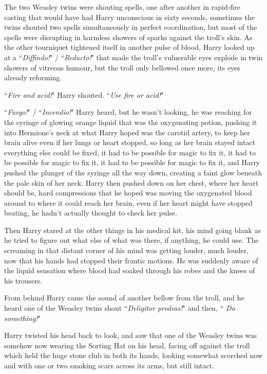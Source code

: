 The two Weasley twins were shouting spells, one after another in rapid-fire casting that would have had Harry unconscious in sixty seconds, sometimes the twins shouted two spells simultaneously in perfect coordination, but most of the spells were disrupting in harmless showers of sparks against the troll's skin. As the other tourniquet tightened itself in another pulse of blood, Harry looked up at a ``\emph{Diffindo!}" / ``\emph{Reducto!}" that made the troll's vulnerable eyes explode in twin showers of vitreous humour, but the troll only bellowed once more, its eyes already reforming.

``\emph{Fire and acid!}" Harry shouted. ``\emph{Use fire or acid!}"

``\emph{Fuego!}" / ``\emph{Incendio!}" Harry heard, but he wasn't looking, he was reaching for the syringe of glowing orange liquid that was the oxygenating potion, pushing it into Hermione's neck at what Harry hoped was the carotid artery, to keep her brain alive even if her lungs or heart stopped, so long as her brain stayed intact everything else could be fixed, it had to be possible for magic to fix it, it had to be possible for magic to fix it, it had to be possible for magic to fix it, and Harry pushed the plunger of the syringe all the way down, creating a faint glow beneath the pale skin of her neck. Harry then pushed down on her chest, where her heart should be, hard compressions that he hoped was moving the oxygenated blood around to where it could reach her brain, even if her heart might have stopped beating, he hadn't actually thought to check her pulse.

Then Harry stared at the other things in his medical kit, his mind going blank as he tried to figure out what else of what was there, if anything, he could use. The screaming in that distant corner of his mind was getting louder, much louder, now that his hands had stopped their frantic motions. He was suddenly aware of the liquid sensation where blood had soaked through his robes and the knees of his trousers.

From behind Harry came the sound of another bellow from the troll, and he heard one of the Weasley twins shout ``\emph{Deligitor prodeas!}" and then, ``\emph{ Do something!}"

Harry twisted his head back to look, and saw that one of the Weasley twins was somehow now wearing the Sorting Hat on his head, facing off against the troll which held the huge stone club in both its hands, looking somewhat scorched now and with one or two smoking scars across its arms, but still intact.

